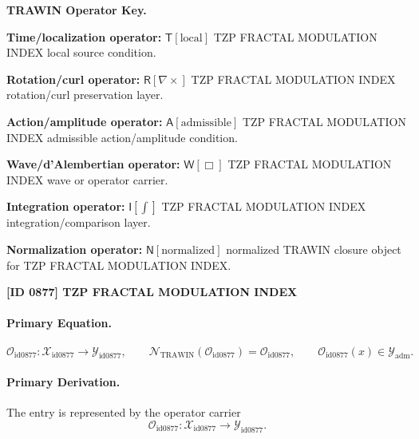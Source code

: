 \par\vspace{0.45\baselineskip}
\noindent\begin{minipage}[t]{\linewidth}
\begingroup
\small
\raggedright
\textbf{TRAWIN Operator Key.}\par
\noindent\textbf{Time/localization operator:} $\mathsf{T}\!\left[\mathrm{local}\right]$ TZP FRACTAL MODULATION INDEX local source condition.\par
\noindent\textbf{Rotation/curl operator:} $\mathsf{R}\!\left[\nabla\times\right]$ TZP FRACTAL MODULATION INDEX rotation/curl preservation layer.\par
\noindent\textbf{Action/amplitude operator:} $\mathsf{A}\!\left[\mathrm{admissible}\right]$ TZP FRACTAL MODULATION INDEX admissible action/amplitude condition.\par
\noindent\textbf{Wave/d'Alembertian operator:} $\mathsf{W}\!\left[\Box\right]$ TZP FRACTAL MODULATION INDEX wave or operator carrier.\par
\noindent\textbf{Integration operator:} $\mathsf{I}\!\left[\int\right]$ TZP FRACTAL MODULATION INDEX integration/comparison layer.\par
\noindent\textbf{Normalization operator:} $\mathsf{N}\!\left[\mathrm{normalized}\right]$ normalized TRAWIN closure object for TZP FRACTAL MODULATION INDEX.\par
\endgroup
\end{minipage}

\clearpage
\noindent\textbf{[ID 0877] TZP FRACTAL MODULATION INDEX}\par
\vspace{0.35em}
\paragraph{Primary Equation.}
\[
\mathcal{O}_{\mathrm{id0877}}:\mathcal{X}_{\mathrm{id0877}}\longrightarrow \mathcal{Y}_{\mathrm{id0877}},\qquad
\mathcal{N}_{\mathrm{TRAWIN}}(\mathcal{O}_{\mathrm{id0877}})=\mathcal{O}_{\mathrm{id0877}},\qquad
\mathcal{O}_{\mathrm{id0877}}(x)\in\mathcal{Y}_{\mathrm{adm}}.
\]

\paragraph{Primary Derivation.} The entry is represented by the operator carrier\[
\mathcal{O}_{\mathrm{id0877}}:\mathcal{X}_{\mathrm{id0877}}\longrightarrow \mathcal{Y}_{\mathrm{id0877}}.
\]

